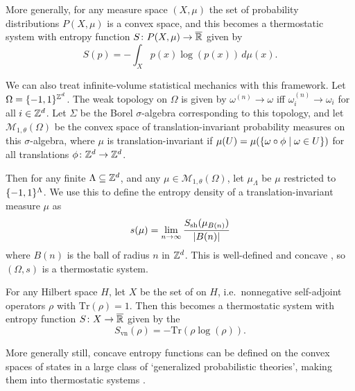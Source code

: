 \documentclass[12pt, reqno]{amsart}
\newcommand{\extreal}{\overline{\real}}
\newcommand{\Ssh}{S_{\mathrm{sh}}} %
\begin{document}
\begin{example} 
\label{ex:measure_space}
    More generally, for any measure space $(X, \mu)$ the set of probability distributions $P(X, \mu)$ is a convex space, and this becomes a thermostatic system with entropy function $S \maps P(X, \mu) \to \extreal$ given by 
    \[   S(p) = -\int_X p(x) \log(p(x)) \, d\mu(x) .\]
\end{example}

\begin{example}
    We can also treat infinite-volume statistical mechanics with this framework. Let $\Omega = \{-1,1\}^{\mathbb{Z}^d}$. The weak topology on $\Omega$ is given by $\omega^{(n)} \to \omega$ iff $\omega^{(n)}_i \to \omega_i$ for all $i \in \mathbb{Z}^d$. Let $\Sigma$ be the Borel $\sigma$-algebra corresponding to this topology, and let $\mathcal{M}_{1,\theta}(\Omega)$ be the convex space of translation-invariant probability measures on this $\sigma$-algebra, where $\mu$ is translation-invariant if $\mu(U) = \mu(\{\omega \circ \phi \mid \omega \in U\})$ for all translations $\phi \colon \mathbb{Z}^d \rightarrow \mathbb{Z}^d$.
    
    Then for any finite $\Lambda \subseteq \mathbb{Z}^d$, and any $\mu \in \mathcal{M}_{1,\theta}(\Omega)$, let $\mu_\Lambda$ be $\mu$ restricted to $\{-1,1\}^\Lambda$. We use this to define the entropy density of a translation-invariant measure $\mu$ as
    \[ s(\mu) = \limas_{n \to \infty} \frac{\Ssh(\mu_{B(n)})}{\abs{B(n)}} \]
    where $B(n)$ is the ball of radius $n$ in $\mathbb{Z}^d$. This is well-defined and concave \cite[Proposition 6.75]{FriedliVelenik}, so $(\Omega,s)$ is a thermostatic system.
\end{example}

\begin{example} 
\label{ex:density_matrices}
    For any Hilbert space $H$, let $X$ be the set of  on $H$, i.e.\ nonnegative self-adjoint operators $\rho$ with $\mathrm{Tr}(\rho) = 1$. Then this becomes a thermostatic system with entropy function $S \maps X \to \extreal$ given by the 
    \[  S_{\mathrm{vn}}(\rho) = -\mathrm{Tr}(\rho \log(\rho)) .\]
\end{example}

More generally still, concave entropy functions can be defined on the convex spaces of states in a large class of `generalized probabilistic theories', making them into thermostatic systems \cite{Barnum_et_al,Krumm_et_al,ShortWehner}. 
\end{document}
